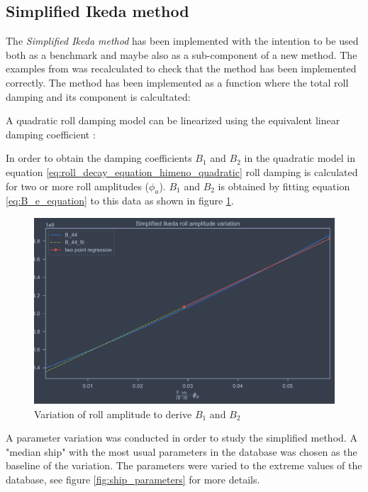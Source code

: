 \subsection{Simplified Ikeda method}
\label{se:simplified_ikeda}
The \emph{Simplified Ikeda method} \cite{kawahara_simple_2011} has been implemented with the intention to be used both as a benchmark and maybe also as a sub-component of a new method. The examples from \cite{kawahara_simple_2011} was recalculated to check that the method has been implemented correctly.
The method has been implemented as a function where the total roll damping and its component is calcultated: 


A quadratic roll damping model can be linearized using the equivalent linear damping coefficient \cite{himeno_prediction_1981}:

In order to obtain the damping coefficients $B_1$ and $B_2$ in the quadratic model in equation \ref{eq:roll_decay_equation_himeno_quadratic} roll damping is calculated for two or more roll amplitudes ($\phi_a$). $B_1$ and $B_2$ is obtained by fitting equation \ref{eq:B_e_equation} to this data as shown in figure \ref{fig:ikeda_B_1_B2}.  

\begin{figure}[H]
    \centering
    \includegraphics[width=\columnwidth]{figures/ikeda_B_1_B_2.pdf}
    \caption{Variation of roll amplitude to derive $B_1$ and $B_2$}
    \label{fig:ikeda_B_1_B2}
\end{figure}

A parameter variation was conducted in order to study the simplified method.
A "median ship" with the most usual parameters in the database was chosen as the baseline of the variation. The parameters were varied to the extreme values of the database, see figure \ref{fig:ship_parameters} for more details. 

